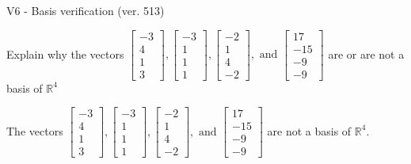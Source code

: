 \begin{exercise}
  \begin{exerciseTitle}V6 - Basis verification (ver. 513)\end{exerciseTitle}
  \begin{exerciseStatement}
    Explain why the vectors \(\left[\begin{array}{r}
-3 \\
4 \\
1 \\
3
\end{array}\right] , \left[\begin{array}{r}
-3 \\
1 \\
1 \\
1
\end{array}\right] , \left[\begin{array}{r}
-2 \\
1 \\
4 \\
-2
\end{array}\right] , \text{ and } \left[\begin{array}{r}
17 \\
-15 \\
-9 \\
-9
\end{array}\right]\) are or are not a basis of \(\mathbb{R}^4\)	


  \end{exerciseStatement}
  \begin{exerciseAnswer}
   The vectors \(\left[\begin{array}{r}
-3 \\
4 \\
1 \\
3
\end{array}\right] , \left[\begin{array}{r}
-3 \\
1 \\
1 \\
1
\end{array}\right] , \left[\begin{array}{r}
-2 \\
1 \\
4 \\
-2
\end{array}\right] , \text{ and } \left[\begin{array}{r}
17 \\
-15 \\
-9 \\
-9
\end{array}\right]\) 
  	 are not  a basis of \(\mathbb{R}^4\).
  


  \end{exerciseAnswer}
\end{exercise}